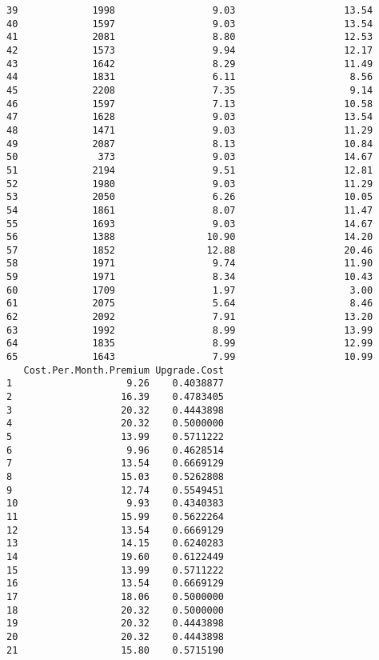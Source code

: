 \documentclass[
]{article}
\begin{document}
\begin{verbatim}
39             1998                 9.03                   13.54
40             1597                 9.03                   13.54
41             2081                 8.80                   12.53
42             1573                 9.94                   12.17
43             1642                 8.29                   11.49
44             1831                 6.11                    8.56
45             2208                 7.35                    9.14
46             1597                 7.13                   10.58
47             1628                 9.03                   13.54
48             1471                 9.03                   11.29
49             2087                 8.13                   10.84
50              373                 9.03                   14.67
51             2194                 9.51                   12.81
52             1980                 9.03                   11.29
53             2050                 6.26                   10.05
54             1861                 8.07                   11.47
55             1693                 9.03                   14.67
56             1388                10.90                   14.20
57             1852                12.88                   20.46
58             1971                 9.74                   11.90
59             1971                 8.34                   10.43
60             1709                 1.97                    3.00
61             2075                 5.64                    8.46
62             2092                 7.91                   13.20
63             1992                 8.99                   13.99
64             1835                 8.99                   12.99
65             1643                 7.99                   10.99
   Cost.Per.Month.Premium Upgrade.Cost
1                    9.26    0.4038877
2                   16.39    0.4783405
3                   20.32    0.4443898
4                   20.32    0.5000000
5                   13.99    0.5711222
6                    9.96    0.4628514
7                   13.54    0.6669129
8                   15.03    0.5262808
9                   12.74    0.5549451
10                   9.93    0.4340383
11                  15.99    0.5622264
12                  13.54    0.6669129
13                  14.15    0.6240283
14                  19.60    0.6122449
15                  13.99    0.5711222
16                  13.54    0.6669129
17                  18.06    0.5000000
18                  20.32    0.5000000
19                  20.32    0.4443898
20                  20.32    0.4443898
21                  15.80    0.5715190

\end{verbatim}
\end{document}
